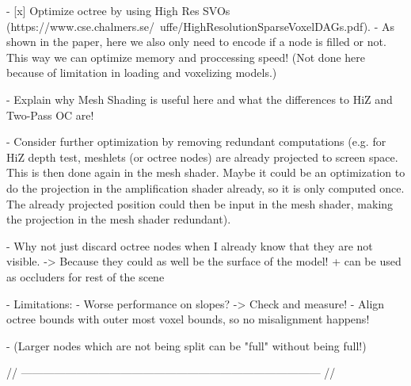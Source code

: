 - [x] Optimize octree by using High Res SVOs (https://www.cse.chalmers.se/~uffe/HighResolutionSparseVoxelDAGs.pdf).
    - As shown in the paper, here we also only need to encode if a node is filled or not. This way we can 
    optimize memory and proccessing speed! (Not done here because of limitation in loading and voxelizing models.)

- Explain why Mesh Shading is useful here and what the differences to HiZ and Two-Pass OC are!

- Consider further optimization by removing redundant computations (e.g. for HiZ depth test, meshlets (or octree nodes)
are already projected to screen space. This is then done again in the mesh shader. Maybe it could be an optimization 
to do the projection in the amplification shader already, so it is only computed once. The already projected position 
could then be input in the mesh shader, making the projection in the mesh shader redundant).

- Why not just discard octree nodes when I already know that they are not visible. -> Because they could as well be the
  surface of the model! + can be used as occluders for rest of the scene

- Limitations: 
    - Worse performance on slopes? -> Check and measure!
    - Align octree bounds with outer most voxel bounds, so no misalignment happens!

    - (Larger nodes which are not being split can be "full" without being full!)

// --------------------------------------------------------------------------------- //
